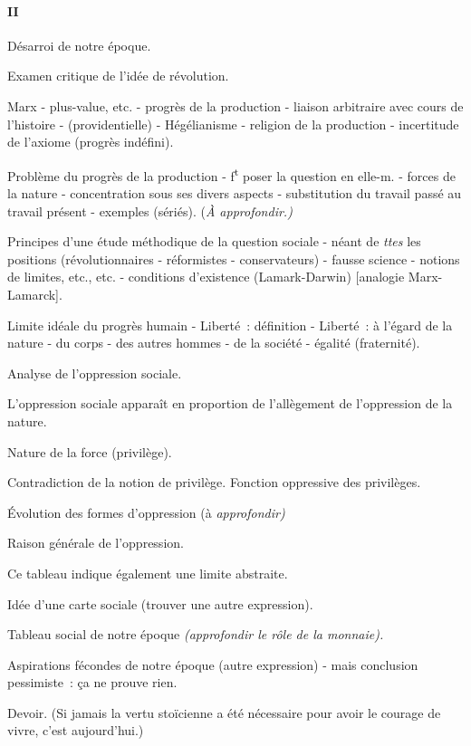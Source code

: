 \documentclass[french,twoside]{book} %
\begin{document}
\paragraph[{II}]{II}
\noindent Désarroi de notre époque.\par
Examen critique de l'idée de révolution.\par
Marx - plus-value, etc. - progrès de la production - liaison arbitraire avec cours de l'histoire - (providentielle) - Hégélianisme - religion de la production - incertitude de l'axiome (progrès indéfini).\par
Problème du progrès de la production - f\textsuperscript{t} poser la question en elle-m. - forces de la nature - concentration sous ses divers aspects - substitution du travail passé au travail présent - exemples (sériés). ({\itshape À approfondir.)}\par
Principes d'une étude méthodique de la question sociale - néant de {\itshape ttes} les positions (révolutionnaires - réformistes - conservateurs) - fausse science - notions de limites, etc., etc. - conditions d'existence (Lamark-Darwin) [analogie Marx-Lamarck].\par
Limite idéale du progrès humain - Liberté : définition - Liberté : à l'égard de la nature - du corps - des autres hommes - de la société - égalité (fraternité).\par
Analyse de l'oppression sociale.\par
L'oppression sociale apparaît en proportion de l'allègement de l'oppression de la nature.\par
Nature de la force (privilège).\par
Contradiction de la notion de privilège. Fonction oppressive des privilèges.\par
Évolution des formes d'oppression (à {\itshape approfondir)}\par
Raison générale de l'oppression.\par
Ce tableau indique également une limite abstraite.\par
Idée d'une carte sociale (trouver une autre expression).\par
Tableau social de notre époque {\itshape (approfondir le rôle de la monnaie).}\par
Aspirations fécondes de notre époque (autre expression) - mais conclusion pessimiste : ça ne prouve rien.\par
Devoir. (Si jamais la vertu stoïcienne a été nécessaire pour avoir le courage de vivre, c'est aujourd'hui.)
\end{document}
